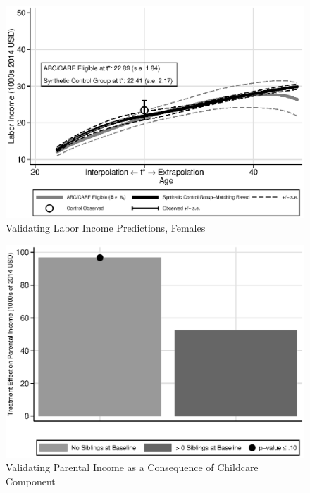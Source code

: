 \begin{frame}[plain]
	\begin{center}
\begin{figure}[H] 
\caption{Validating Labor Income Predictions, Females}
\label{figure:youlabel}
\centering
\includegraphics[width=.9\columnwidth]{output/abccare_disad_0.eps}
\end{figure}
\end{center}
\end{frame}


\begin{frame}[plain]
	\begin{center}
\begin{figure}[H] 
\caption{Validating Parental Income as a Consequence of Childcare Component}
\label{figure:youlabel}
\centering
\includegraphics[width=.9\columnwidth]{output/abccare_pincomesum_spooled.eps}
\end{figure}
\end{center}
\end{frame}

